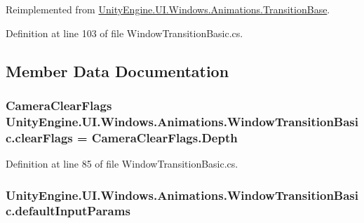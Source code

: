Reimplemented from \hyperlink{class_unity_engine_1_1_u_i_1_1_windows_1_1_animations_1_1_transition_base_a751fa8ec9c985d89678590c01285b964}{Unity\+Engine.\+U\+I.\+Windows.\+Animations.\+Transition\+Base}.



Definition at line 103 of file Window\+Transition\+Basic.\+cs.



\subsection{Member Data Documentation}
\hypertarget{class_unity_engine_1_1_u_i_1_1_windows_1_1_animations_1_1_window_transition_basic_a7a40a1aa1cd457887d8b1e58f82e2479}{}
\subsubsection[{clear\+Flags}]{\setlength{\rightskip}{0pt plus 5cm}Camera\+Clear\+Flags Unity\+Engine.\+U\+I.\+Windows.\+Animations.\+Window\+Transition\+Basic.\+clear\+Flags = Camera\+Clear\+Flags.\+Depth}\label{class_unity_engine_1_1_u_i_1_1_windows_1_1_animations_1_1_window_transition_basic_a7a40a1aa1cd457887d8b1e58f82e2479}


Definition at line 85 of file Window\+Transition\+Basic.\+cs.

\hypertarget{class_unity_engine_1_1_u_i_1_1_windows_1_1_animations_1_1_window_transition_basic_a99dc598d847f0f0136d8f135654ed3ca}{}
\subsubsection[{default\+Input\+Params}]{ Unity\+Engine.\+U\+I.\+Windows.\+Animations.\+Window\+Transition\+Basic.\+default\+Input\+Params}\label{class_unity_engine_1_1_u_i_1_1_windows_1_1_animations_1_1_window_transition_basic_a99dc598d847f0f0136d8f135654ed3ca}


